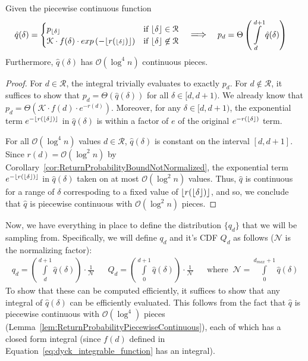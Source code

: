 \begin{lemma}
\label{lem:ReturnProbabilityPiecewiseContinuous}
Given the piecewise continuous function
\begin{align*}
    \hat q(\delta) &=
    \begin{cases}
        p_{\floor\delta} &\mbox{if } \floor\delta \in \mathcal R \\ 
        \mathcal K\cdot f(\delta)\cdot exp\left(-\lfloor{r({\scriptstyle\floor\delta})}\rfloor\right)
        & \mbox{if } \floor\delta \not\in \mathcal R
    \end{cases}
    && \mathlarger \implies
    && p_d = \Theta\left( \int\limits_d^{d+1} \hat q(\delta)\right)
\end{align*}
Furthermore, $\hat q(\delta)$ has $\mathcal O(\log^4 n)$ continuous pieces.
\end{lemma}
\begin{proof}
For $d \in \mathcal R$, the integral trivially evaluates to exactly $p_d$.
For $d\not\in \mathcal R$, it suffices to show that $p_d = \Theta\left( \hat q(\delta)\right)$ for all $\delta\in [d,d+1)$.
We already know that $p_d = \Theta\left( \mathcal K\cdot f(d)\cdot e^{-r(d)}\right)$.
Moreover, for any $\delta\in [d,d+1)$, the exponential term $e^{-\lfloor r(\lfloor\delta\rfloor)\rfloor}$ in $\hat q(\delta)$
is within a factor of $e$ of the original $e^{-r(\lfloor\delta\rfloor)}$ term.

For all $\mathcal O(\log^4 n)$ values $d\in \mathcal R$, $\hat q(\delta)$ is constant on the interval $[d,d+1]$.
Since $r(d) = \mathcal O(\log^2 n)$ by Corollary~\ref{cor:ReturnProbabilityBoundNotNormalized},
the exponential term $e^{-\lfloor r(\lfloor\delta\rfloor)\rfloor}$ in $\hat q(\delta)$ taken on at most $\mathcal O(\log^2 n)$ values.
Thus, $\hat q$ is continuous for a range of $\delta$ correspoding to a fixed value of $\lfloor r(\lfloor\delta\rfloor)\rfloor$,
and so, we conclude that $\hat q$ is piecewise continuous with $\mathcal O(\log^2 n)$ pieces.
\end{proof}

Now, we have everything in place to define the distribution $\{ q_d\}$ that we will be sampling from.
Specifically, we will define $q_d$ and it's CDF $Q_d$ as follows ($\mathcal N$ is the normalizing factor):
{\small
    \begin{align}
        q_d = \left(\int\limits_d^{d+1} \hat q(\delta)\right)\cdot \frac{1}{\mathcal N}
        && Q_d = \left(\int\limits_0^{d+1} \hat q(\delta)\right)\cdot \frac{1}{\mathcal N}
        && \textrm{where }\ \mathcal N = \int\limits_0^{d_{max}+1} \hat q(\delta)
    \end{align}}
To show that these can be computed efficiently, it suffices to show that any integral of $\hat q(\delta)$ can be efficiently evaluated.
This follows from the fact that $\hat q$ is piecewise continuous with $\mathcal O(\log^4)$ pieces (Lemma~\ref{lem:ReturnProbabilityPiecewiseContinuous}),
each of which has a closed form integral (since $f(d)$ defined in Equation~\ref{eq:dyck_integrable_function} has an integral).


